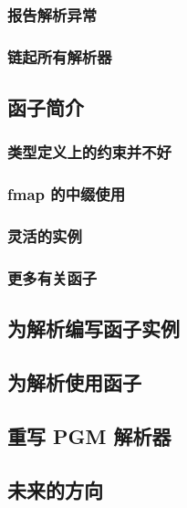 \documentclass[./main.tex]{subfiles}
\begin{document}
\subsubsection*{报告解析异常}

\subsubsection*{链起所有解析器}

\subsection*{函子简介}

\subsubsection*{类型定义上的约束并不好}

\subsubsection*{fmap 的中缀使用}

\subsubsection*{灵活的实例}

\subsubsection*{更多有关函子}

\subsection*{为解析编写函子实例}

\subsection*{为解析使用函子}

\subsection*{重写 PGM 解析器}

\subsection*{未来的方向}
\end{document}
